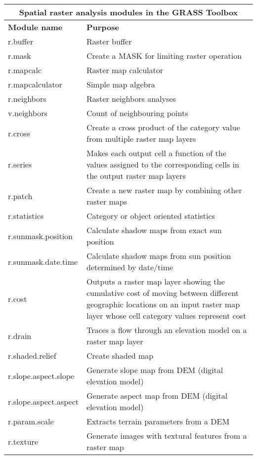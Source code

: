 \begin{table}[H]
\centering
 \begin{tabular}{|p{4cm}|p{10cm}|}
  \hline \multicolumn{2}{|c|}{\textbf{Spatial raster analysis modules in the
  GRASS Toolbox}} \\
  \hline \textbf{Module name} & \textbf{Purpose} \\
  \hline r.buffer & Raster buffer \\
  \hline r.mask & Create a MASK for limiting raster operation \\
  \hline r.mapcalc & Raster map calculator \\
  \hline r.mapcalculator & Simple map algebra \\
  \hline r.neighbors & Raster neighbors analyses \\
  \hline v.neighbors & Count of neighbouring points \\
  \hline r.cross & Create a cross product of the category value from multiple
  raster map layers \\
  \hline r.series & Makes each output cell a function of the values assigned
  to the corresponding cells in the output raster map layers\\
  \hline r.patch & Create a new raster map by combining other raster maps \\
  \hline r.statistics & Category or object oriented statistics \\
  \hline r.sunmask.position & Calculate shadow maps from exact sun position \\
  \hline r.sunmask.date.time & Calculate shadow maps from sun position determined by date/time\\
  \hline r.cost & Outputs a raster map layer showing the cumulative cost of
  moving between different geographic locations on an input raster map layer
  whose cell category values represent cost\\
  \hline r.drain & Traces a flow through an elevation model on a raster map
  layer \\
  \hline r.shaded.relief & Create shaded map \\
  \hline r.slope.aspect.slope & Generate slope map from DEM (digital
  elevation model) \\
  \hline r.slope.aspect.aspect & Generate aspect map from DEM (digital
  elevation model) \\
  \hline r.param.scale & Extracts terrain parameters from a DEM \\
  \hline r.texture & Generate images with textural features from a raster map

\end{tabular}
\end{table}

